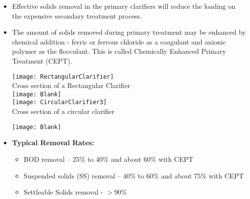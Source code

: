 \begin{itemize}
		\item Effective solids removal in the primary clarifiers will 			reduce the loading on the expensive secondary treatment 				process.
		\item The amount of solids removed during primary treatment 			may be enhanced by chemical addition - ferric or ferrous 				chloride as a coagulant and anionic polymer as the flocculant.  		This is called Chemically Enhanced Primary Treatment (CEPT).
		\begin{center}
				\texttt{[image: RectangularClarifier]}\\
				Cross section of a Rectangular Clarifier\\
				\texttt{[image: Blank]}\\
				\texttt{[image: CircularClarifier3]}\\
				Cross section of a circular clarifier\\
			\end{center}
				\texttt{[image: Blank]}\\
\item \textbf{Typical Removal Rates:}\\
\begin{itemize}
\item \hspace{10mm} BOD removal – 25\% to 40\% and about 60\% with CEPT
\item \hspace{10mm} Suspended solids (SS) removal – 40\% to 60\% and about 75\% with CEPT
\item \hspace{10mm} Settleable Solids removal - $>$90\%
\end{itemize}
\end{itemize}

